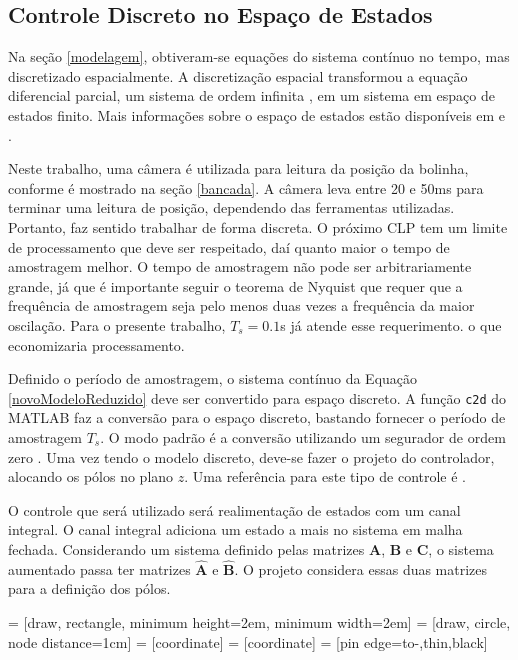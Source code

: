 \subsection{Controle Discreto no Espaço de Estados}
 Na seção \ref{modelagem}, obtiveram-se equações do sistema contínuo no tempo, mas discretizado espacialmente. A discretização espacial transformou a equação diferencial parcial, um sistema de ordem infinita \cite{fabricioIFAC}, em um sistema em espaço de estados finito. Mais informações sobre o espaço de estados estão disponíveis em \cite{Ogata:2010} e \cite{OgataDiscrete:1995}. 
 
 Neste trabalho, uma câmera é utilizada para leitura da posição da bolinha, conforme é mostrado na seção \ref{bancada}. A câmera leva entre 20 e 50ms para terminar uma leitura de posição, dependendo das ferramentas utilizadas. Portanto, faz sentido trabalhar de forma discreta. O próximo CLP tem um limite de processamento que deve ser respeitado, daí quanto maior o tempo de amostragem melhor. O tempo de amostragem não pode ser arbitrariamente grande, já que é importante seguir o teorema de Nyquist \cite{Ogata:2010} que requer que a frequência de amostragem seja pelo menos duas vezes a frequência da maior oscilação. Para o presente trabalho, $T_s = 0.1$s já atende esse requerimento. o que economizaria processamento.

 Definido o período de amostragem, o sistema contínuo da Equação \ref{novoModeloReduzido} deve ser convertido para espaço discreto. A função \texttt{c2d} do MATLAB \cite{c2d} faz a conversão para o espaço discreto, bastando fornecer o período de amostragem $T_s$. O modo padrão é a conversão utilizando um segurador de ordem zero \cite{OgataDiscrete:1995}. Uma vez tendo o modelo discreto, deve-se fazer o projeto do controlador, alocando os pólos no plano $z$. Uma referência para este tipo de controle é \cite{OgataDiscrete:1995}.

 O controle que será utilizado será realimentação de estados com um canal integral. O canal integral adiciona um estado a mais no sistema em malha fechada. Considerando um sistema definido pelas matrizes $\mathbf{A}$, $\mathbf{B}$ e $\mathbf{C}$, o sistema aumentado passa ter matrizes $\mathbf{\hat{A}}$ e $\mathbf{\hat{B}}$. O projeto considera essas duas matrizes para a definição dos pólos.

 = [draw, rectangle, 
minimum height=2em, minimum width=2em]
 = [draw, circle, node distance=1cm]
 = [coordinate]
 = [coordinate]
 = [pin edge={to-,thin,black}]

